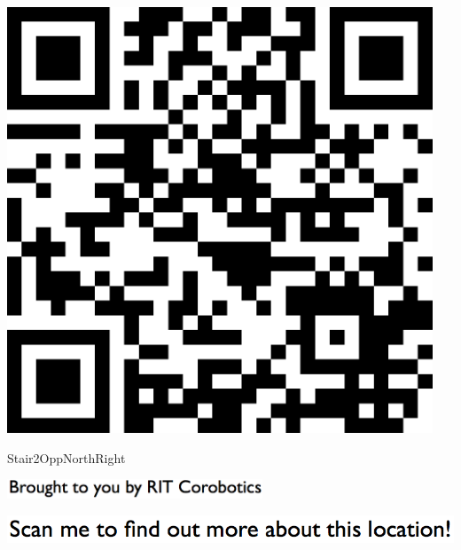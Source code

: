 \documentclass[letterpaper]{article}
\begin{document}
 \begingroup 
 \centerline{\includegraphics[scale=1,width=5in,height=5in]{Stair2OppNorthRight.png}} 
 \endgroup 
 \vspace*{\fill} 

 \hfill{\small Stair2OppNorthRight} 

  \vspace{0.7in} 
 
 \centerline{\includegraphics[scale=1,width=3in]{text-bottom.png}} 
 
 \pagebreak 
{} 
 \vspace*{\fill} 
 
  \centerline{\includegraphics[scale=1,width=6in]{text-top.png}} 
 
 \vspace{0.5in} 
 
\end{document}
